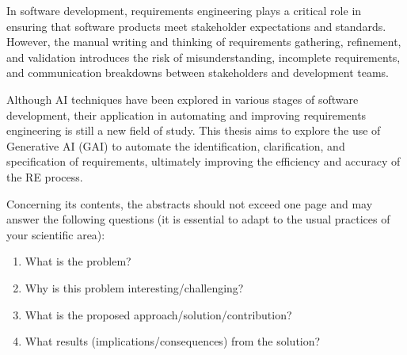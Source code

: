 
%

In software development, requirements engineering plays a critical role in ensuring
that software products meet stakeholder expectations and standards.
However, the manual writing and thinking of requirements gathering, refinement,
 and validation introduces the risk of misunderstanding, incomplete requirements,
  and communication breakdowns between stakeholders and development teams.

% 

Although AI techniques have been explored in various stages of software development,
 their application in automating and improving requirements engineering is still a new 
 field of study. This thesis aims to explore the use of Generative AI (GAI) to automate the identification, clarification, and specification of requirements, ultimately improving the efficiency and accuracy of the RE process.




Concerning its contents, the abstracts should not exceed one page and may answer the following questions (it is essential to adapt to the usual practices of your scientific area):

\begin{enumerate}
  \item What is the problem?
  \item Why is this problem interesting/challenging?
  \item What is the proposed approach/solution/contribution?
  \item What results (implications/consequences) from the solution?
\end{enumerate}

